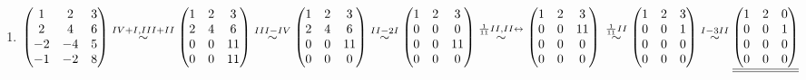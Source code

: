 \documentclass{article}
\newcommand{\uu}[1]{\underline{\underline{#1}}}
\newcommand{\eqto}[1]{\overset{#1}{\sim}}
\begin{document}
\begin{enumerate}[A =]
    \item $\begin{pmatrix}
        1&2&3\\
        2&4&6\\
        -2&-4&5\\
        -1&-2&8
    \end{pmatrix}
    \eqto{IV+I, III+II}
    \begin{pmatrix}
        1&2&3\\
        2&4&6\\
        0&0&11\\
        0&0&11
    \end{pmatrix}
    \eqto{III-IV}
    \begin{pmatrix}
        1&2&3\\
        2&4&6\\
        0&0&11\\
        0&0&0
    \end{pmatrix} 
    \eqto{II-2I}
    \begin{pmatrix}
        1&2&3\\
        0&0&0\\
        0&0&11\\
        0&0&0
    \end{pmatrix} 
    \eqto{\frac{1}{11}II, II \leftrightarrow}
    \begin{pmatrix}
        1&2&3\\
        0&0&11\\
        0&0&0\\
        0&0&0
    \end{pmatrix}  \\ \\ \\
    \eqto{\frac{1}{11}II}
    \begin{pmatrix}
        1&2&3\\
        0&0&1\\
        0&0&0\\
        0&0&0
    \end{pmatrix} 
    \eqto{I-3II}
    \uu{
    \begin{pmatrix}
        1&2&0\\
        0&0&1\\
        0&0&0\\
        0&0&0
    \end{pmatrix}}$
        
\end{enumerate}
\newpage
\end{document}
